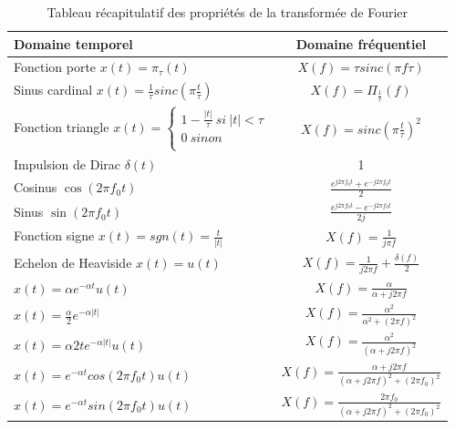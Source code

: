 	\begin{table}[h!]
		\centering
		\caption{\label{Tab:Transfo_Fourier_usuelles} Tableau récapitulatif des propriétés de la transformée de Fourier}
		\begin{tabular}{|l|c|}
			\hline
			\textbf{Domaine temporel} & \textbf{Domaine fréquentiel} \\
			\hline
			Fonction porte $x(t)=\pi_{\tau}(t)$ & $X(f)=\tau sinc(\pi f \tau)$ \\	
			\hline
			Sinus cardinal $x(t)=\frac{1}{\tau} sinc(\pi \frac{t}{\tau})$  & $X(f)=\Pi_{\frac{1}{\tau}}(f)$ \\	
			\hline
			Fonction triangle $x(t)=	\left \{
			\begin{array}{l}
			1-\frac{|t|}{\tau}~si~|t|<\tau \\
			0~sinon \\
			\end{array}
			\right .$  & $X(f)=sinc(\pi \frac{t}{\tau})^{2}$ \\	
			\hline
			Impulsion de Dirac $\delta(t)$ & 1 \\	
			\hline
			Cosinus $\cos(2\pi f_0 t)$ & $\frac{e^{j2\pi f_0 t}+e^{-j2\pi f_0 t}}{2}$ \\	
			\hline
			Sinus $\sin(2\pi f_0 t)$ & $\frac{e^{j2\pi f_0 t}-e^{-j2\pi f_0 t}}{2j}$ \\	
			\hline
			Fonction signe $x(t)=sgn(t)=\frac{t}{|t|}$ & $X(f)=\frac{1}{j\pi f}$ \\	
			\hline
			Echelon de Heaviside $x(t)=u(t)$ & $X(f)=\frac{1}{j2\pi f} + \frac{\delta(f)}{2}$ \\	
			\hline
			$x(t)=\alpha e^{-\alpha t}u(t)$ & $X(f)=\frac{\alpha}{\alpha+j2\pi f}$ \\	
			\hline
			$x(t)=\frac{\alpha}{2} e^{-\alpha |t|}$ & $X(f)=\frac{\alpha^{2}}{\alpha^{2}+(2\pi f)^{2}}$ \\	
			\hline
			$x(t)=\alpha{2}te^{-\alpha |t|}u(t)$ & $X(f)=\frac{\alpha^{2}}{(\alpha+j2\pi f)^{2}}$ \\	
			\hline
			$x(t)=e^{-\alpha t}cos(2 \pi f_0 t)u(t)$ & $X(f)=\frac{\alpha+j2\pi f}{(\alpha+j2\pi f)^{2}+(2\pi f_0)^{2}}$ \\	
			\hline
			$x(t)=e^{-\alpha t}sin(2 \pi f_0 t)u(t)$ & $X(f)=\frac{2\pi f_0}{(\alpha+j2\pi f)^{2}+(2\pi f_0)^{2}}$ \\	
			\hline
		\end{tabular}	
	\end{table}
	
	

